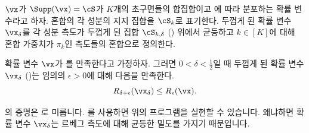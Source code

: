 \documentclass[../../book-main_ko.tex]{subfiles}
\begin{document}
\begin{definition}\label{def:thickening-rv-uos}
    \(\vx\)가 \(\Supp(\vx) = \cS\)가 \(K\)개의 초구면들의 합집합이고 에 따라 분포하는 확률 변수라고 하자.
    혼합의 각 성분의 지지 집합을 \(\cS_k\)로 표기한다.
    두껍게 된 확률 변수 \(\vx_{\delta}\)를 각 성분 측도가 두껍게 된 집합 \(\cS_{k, \delta}\) () 위에서 균등하고 \(k \in [K]\)에 대해 혼합 가중치가 \(\pi_k\)인 측도들의 혼합으로 정의한다.
\end{definition}


\begin{lemma}\label{lem:rate-distortion-lb-uos}
    확률 변수 \(\vx\)가 를 만족한다고 가정하자. 그러면 \(0 < \delta < \tfrac{1}{2}\)일 때 두껍게 된 확률 변수 \(\vx_{\delta}\) ()는 임의의 \(\epsilon > 0\)에 대해 다음을 만족한다.
    \begin{equation}
        R_{\delta + \epsilon}(\vx_{\delta})
        \leq
        R_{\epsilon}(\vx).
    \end{equation}
\end{lemma}

의 증명은 로 미룹니다.
를 사용하면 위의 프로그램을 실현할 수 있습니다. 왜냐하면 확률 변수 \(\vx_{\delta}\)는 르베그 측도에 대해 균등한 밀도를 가지기 때문입니다.
\end{document}
